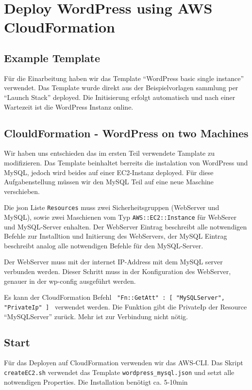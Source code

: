 \section{Deploy WordPress using AWS CloudFormation}

\subsection{Example Template}
Für die Einarbeitung haben wir das Template \enquote{WordPress basic single instance} verwendet. Das Template wurde direkt aus der Beispielvorlagen sammlung per \enquote{Launch Stack} deployed. Die Initisierung erfolgt automatisch und nach einer Wartezeit ist die WordPress Instanz online.

\subsection{ClouldFormation - WordPress on two Machines}
Wir haben uns entschieden das im ersten Teil verwendete Tamplate zu modifizieren. Das Template beinhaltet berreits die instalation von WordPress und MySQL, jedoch wird beides auf einer EC2-Instanz deployed. Für diese Aufgabenstellung müssen wir den MySQL Teil auf eine neue Maschine verschieben.

Die json Liste \texttt{Resources} muss zwei Sicherheitsgruppen (WebServer und MySQL), sowie zwei Maschienen vom Typ \texttt{AWS::EC2::Instance} für WebSerer und MySQL-Server enhalten. Der WebServer Eintrag beschreibt alle notwendigen Befehle zur Installtion und Initierung des WebServers, der MySQL Eintrag beschreibt analog alle notwendigen Befehle für den MySQL-Server.

Der WebServer muss mit der internet IP-Address mit dem MySQL server verbunden werden. Dieser Schritt muss in der Konfiguration des WebServer, genauer in der wp-config ausgeführt werden.

Es kann der CloudFormation Befehl \texttt{{ "Fn::GetAtt" : [ "MySQLServer", "PrivateIp" ] }} verwendet werden. Die Funktion gibt die PrivateIp der Resource \enquote{MySQLServer} zurück. Mehr ist zur Verbindung nicht nötig.

\subsection{Start}
Für das Deployen auf CloudFormation verwenden wir das AWS-CLI. Das Skript \texttt{createEC2.sh} verwendet das Template \texttt{wordpress\_mysql.json} und setzt alle notwendigen Properties. Die Installation benötigt ca. 5-10min

